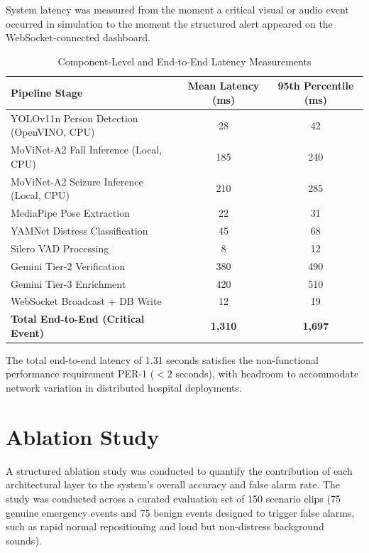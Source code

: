 System latency was measured from the moment a critical visual or audio event
occurred in simulation to the moment the structured alert appeared on the
WebSocket-connected dashboard.

\begin{table}[H]
    \centering
    \caption{Component-Level and End-to-End Latency Measurements}
    \label{tab:latency}
    \renewcommand{\arraystretch}{1.3}
    \begin{tabular}{|l|c|c|}
    \hline
    \textbf{Pipeline Stage} & \textbf{Mean Latency (ms)} & \textbf{95th Percentile (ms)} \\ \hline
    YOLOv11n Person Detection (OpenVINO, CPU) & 28 & 42 \\ \hline
    MoViNet-A2 Fall Inference (Local, CPU) & 185 & 240 \\ \hline
    MoViNet-A2 Seizure Inference (Local, CPU) & 210 & 285 \\ \hline
    MediaPipe Pose Extraction & 22 & 31 \\ \hline
    YAMNet Distress Classification & 45 & 68 \\ \hline
    Silero VAD Processing & 8 & 12 \\ \hline
    Gemini Tier-2 Verification & 380 & 490 \\ \hline
    Gemini Tier-3 Enrichment & 420 & 510 \\ \hline
    WebSocket Broadcast + DB Write & 12 & 19 \\ \hline
    \textbf{Total End-to-End (Critical Event)} & \textbf{1,310} & \textbf{1,697} \\ \hline
    \end{tabular}
\end{table}

The total end-to-end latency of 1.31 seconds satisfies the non-functional
performance requirement PER-1 ($<2$ seconds), with headroom to accommodate
network variation in distributed hospital deployments.

\section{Ablation Study}
\label{sec:ablation}

A structured ablation study was conducted to quantify the contribution of each
architectural layer to the system's overall accuracy and false alarm rate.
The study was conducted across a curated evaluation set of 150 scenario clips
(75 genuine emergency events and 75 benign events designed to trigger false alarms,
such as rapid normal repositioning and loud but non-distress background sounds).

